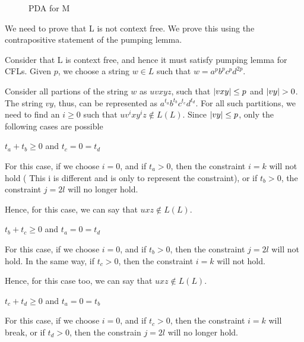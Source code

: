 \documentclass{article}
\begin{document}
\begin{question}
\begin{qpart}{2}
\begin{figure}[h!]
\begin{tikzpicture}[->, >=stealth', shorten >=1pt, auto, node distance=2.8cm, semithick]
				\end{tikzpicture}
				\caption{PDA for M}
				\label{fig:m_pda}
			\end{figure}

	\end{qpart}

	\begin{qpart}{3}

		We need to prove that L is not context free. We prove this using the contrapositive statement of the pumping lemma. \br%

		Consider that L is context free, and hence it must satisfy pumping lemma for CFLs. Given $p$, we choose a string $w \in L$ such that $w = a^p b^p c^p d^{2p}$. \br%
		
		Consider all partions of the string $w$ as $uvxyz$, such that $\abs{vxy} \le p$ and $\abs{vy} > 0$. The string $vy$, thus, can be represented as $a^{t_a} b^{t_b} c^{t_c} d^{t_d}$. For all such partitions, we need to find an $i \ge 0$ such that $u v^i x y^i z \notin L(L)$. Since $\abs{vy} \le p$, only the following cases are possible \br%

		\begin{qcase}{1}{$t_a + t_b \ge 0$ and $t_c = 0 = t_d$}

			For this case, if we choose $i = 0$, and if $t_a > 0$, then the constraint $i = k$ will not hold ( This i is different and is only to represent the constraint), or if $t_b > 0$, the constraint $j = 2l$ will no longer hold. \br%
			
			Hence, for this case, we can say that $uxz \notin L(L)$.
			
		\end{qcase}

		\begin{qcase}{2}{$t_b + t_c \ge 0$ and $t_a = 0 = t_d$}

			For this case, if we choose $i = 0$, and if $t_b > 0$, then the constraint $j = 2l$ will not hold. In the same way, if $t_c > 0$, then the constraint $i = k$ will not hold. \br%

			Hence, for this case too, we can say that $uxz \notin L(L)$.
			
		\end{qcase}

		\begin{qcase}{3}{$t_c + t_d \ge 0$ and $t_a = 0 = t_b$}

			For this case, if we choose $i = 0$, and if $t_c > 0$, then the constraint $i = k$ will break, or if $t_d > 0$, then the constrain $j = 2l$ will no longer hold. \br%


\end{qcase}
\end{qpart}
\end{question}
\end{document}
